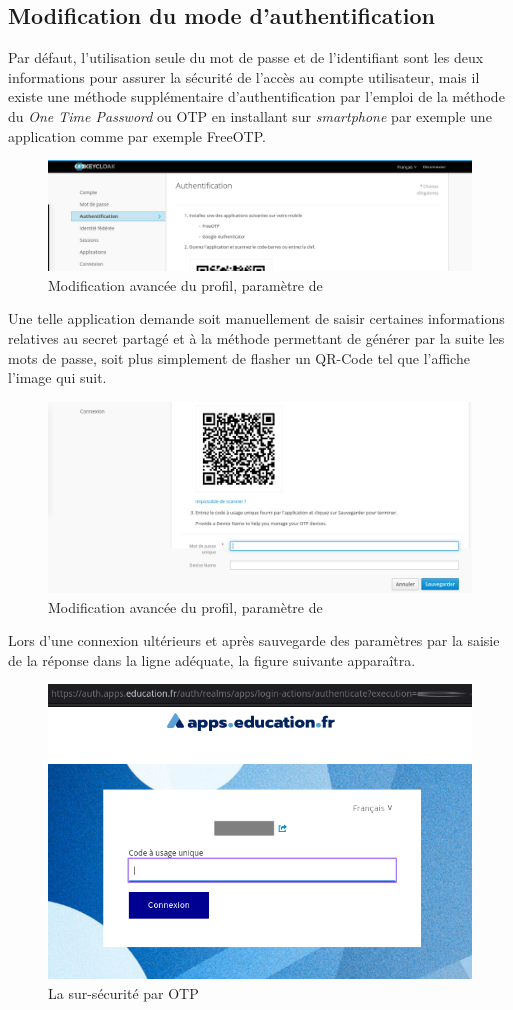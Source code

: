 \subsection{Modification du mode d'authentification}
Par défaut, l'utilisation seule du mot de passe et de l'identifiant sont les deux informations pour assurer la sécurité de l'accès au compte utilisateur, mais il existe une méthode supplémentaire d'authentification par l'emploi de la méthode du \emph{One Time Password\/} ou OTP en installant sur \emph{smartphone} par exemple une application comme par exemple FreeOTP.
\begin{figure}
	\centering
	\includegraphics{./Captures/keycloack.profil.authentification.haut.png}
	\caption{Modification avancée du profil, paramètre de }
\end{figure}
Une telle application demande soit manuellement de saisir certaines informations relatives au secret partagé et à la méthode permettant de générer par la suite les mots de passe, soit plus simplement de flasher un QR-Code tel que l'affiche l'image qui suit.
\begin{figure}
	\centering
	\includegraphics{./Captures/keycloack.profil.authentification.bas.png}
	\caption{Modification avancée du profil, paramètre de }
\end{figure}
Lors d'une connexion ultérieurs et après sauvegarde des paramètres par la saisie de la réponse dans la ligne adéquate, la figure suivante apparaîtra.
\begin{figure}
	\centering
	\includegraphics[width=0.500\linewidth]{./Captures/portail.otp.png}
	\caption{La sur-sécurité par OTP}
\end{figure}
